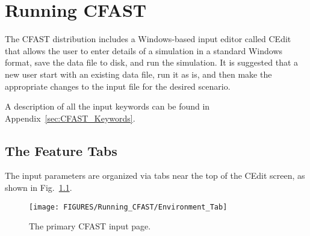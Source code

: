 
\chapter{Running CFAST}


The CFAST distribution includes a Windows-based input editor called CEdit that allows the user to enter details of a simulation in a standard Windows format, save the data file to disk, and run the simulation. It is suggested that a new user start with an existing data file, run it as is, and then make the appropriate changes to the input file for the desired scenario. 

A description of all the input keywords can be found in Appendix~\ref{sec:CFAST_Keywords}.

\section{The Feature Tabs}

The input parameters are organized via tabs near the top of the CEdit screen, as shown in Fig.~\ref{primary_screen}.

\begin{figure}[h!]
\texttt{[image: FIGURES/Running\_CFAST/Environment\_Tab]}
\caption[The primary CFAST input page]{The primary CFAST input page.}
\label{primary_screen}
\end{figure}

